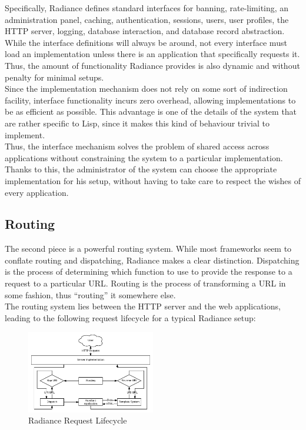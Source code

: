 \documentclass{sig-alternate}
\begin{document}
Specifically, Radiance defines standard interfaces for banning, rate-limiting, an administration panel, caching, authentication, sessions, users, user profiles, the HTTP server, logging, database interaction, and database record abstraction. While the interface definitions will always be around, not every interface must load an implementation unless there is an application that specifically requests it. Thus, the amount of functionality Radiance provides is also dynamic and without penalty for minimal setups. \\

Since the implementation mechanism does not rely on some sort of indirection facility, interface functionality incurs zero overhead, allowing implementations to be as efficient as possible. This advantage is one of the details of the system that are rather specific to Lisp, since it makes this kind of behaviour trivial to implement. \\

Thus, the interface mechanism solves the problem of shared access across applications without constraining the system to a particular implementation. Thanks to this, the administrator of the system can choose the appropriate implementation for his setup, without having to take care to respect the wishes of every application. \\

\subsection{Routing}
The second piece is a powerful routing system. While most frameworks seem to conflate routing and dispatching, Radiance makes a clear distinction. Dispatching is the process of determining which function to use to provide the response to a request to a particular URL. Routing is the process of transforming a URL in some fashion, thus ``routing'' it somewhere else. \\

The routing system lies between the HTTP server and the web applications, leading to the following request lifecycle for a typical Radiance setup: \\

\begin{figure}[H]
  \centering
  \includegraphics[width=0.5\textwidth]{request.pdf}
  \caption{Radiance Request Lifecycle}
\end{figure}
\end{document}

